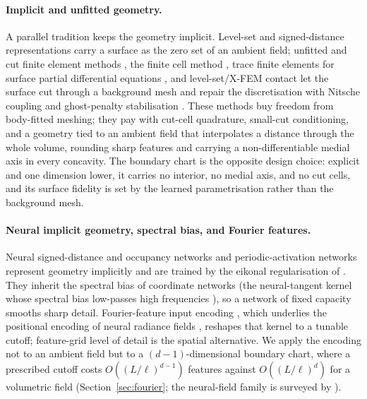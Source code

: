 \documentclass{svjour3}                 %
\begin{document}
\paragraph{Implicit and unfitted geometry.}
A parallel tradition keeps the geometry implicit. Level-set and signed-distance representations
\citep{osher1988fronts,sethian1999levelset,osher2003levelset} carry a surface as the zero set of an ambient
field; unfitted and cut finite element methods \citep{hansbo2002unfitted,hansbo2004strongweak,burman2015cutfem,
burman2025cutfemreview}, the finite cell method \citep{parvizian2007finitecell,schillinger2015finitecell}, trace
finite elements for surface partial differential equations \citep{olshanskii2009tracefem,burman2015laplacebeltrami},
and level-set/X-FEM contact \citep{moes1999xfem,sukumar2001holesinclusions,dolbow2001frictionalcontact} let the
surface cut through a background mesh and repair the discretisation with Nitsche coupling and ghost-penalty
stabilisation \citep{burman2010ghostpenalty}. These methods buy freedom from body-fitted meshing; they pay with cut-cell quadrature, small-cut
conditioning, and a geometry tied to an ambient field that interpolates a distance through
the whole volume, rounding sharp features and carrying a non-differentiable medial axis in every concavity.
The boundary chart is the opposite design choice: explicit and one dimension lower, it carries no interior, no
medial axis, and no cut cells, and its surface fidelity is set by the learned parametrisation rather than the
background mesh.

\paragraph{Neural implicit geometry, spectral bias, and Fourier features.}
Neural signed-distance and occupancy networks \citep{park2019deepsdf,mescheder2019occupancy,chen2019imnet} and
periodic-activation networks \citep{sitzmann2020implicit} represent geometry implicitly and are trained by the
eikonal regularisation of \citet{gropp2020igr}. They inherit the spectral bias of coordinate networks (the
neural-tangent kernel \citep{jacot2018ntk} whose spectral bias low-passes high frequencies
\citep{rahaman2019spectral,xu2020frequency}), so a network of fixed capacity smooths sharp detail. Fourier-feature input encoding
\citep{tancik2020fourier,rahimi2007random}, which underlies the positional encoding of neural radiance fields
\citep{mildenhall2020nerf}, reshapes that kernel to a tunable cutoff; feature-grid level of detail
\citep{takikawa2021nglod} is the spatial alternative. We apply the encoding not to an ambient field but to a
$(d{-}1)$-dimensional boundary chart, where a prescribed cutoff costs $O((L/\ell)^{d-1})$ features against
$O((L/\ell)^{d})$ for a volumetric field (Section~\ref{sec:fourier}; the neural-field family is surveyed by
\citet{xie2022neuralfields}).
\end{document}
